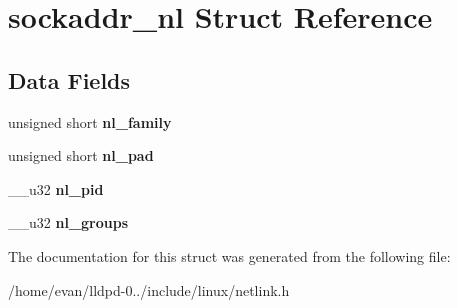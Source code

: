 \section{sockaddr\-\_\-nl \-Struct \-Reference}
\label{structsockaddr__nl}
\subsection*{\-Data \-Fields}
\begin{DoxyCompactItemize}
\item 
unsigned short {\bfseries nl\-\_\-family}\label{structsockaddr__nl_a252124bf19501c09b9168854190a137d}

\item 
unsigned short {\bfseries nl\-\_\-pad}\label{structsockaddr__nl_a95e125dda96431db196f15417b2bd8a4}

\item 
\-\_\-\-\_\-u32 {\bfseries nl\-\_\-pid}\label{structsockaddr__nl_a9978b5c3a39fd429a18badbd61ea47bb}

\item 
\-\_\-\-\_\-u32 {\bfseries nl\-\_\-groups}\label{structsockaddr__nl_ad03093b5dcdf00818e123d5507e02b47}

\end{DoxyCompactItemize}


\-The documentation for this struct was generated from the following file\-:\begin{DoxyCompactItemize}
\item 
/home/evan/lldpd-\/0../include/linux/netlink.\-h\end{DoxyCompactItemize}
